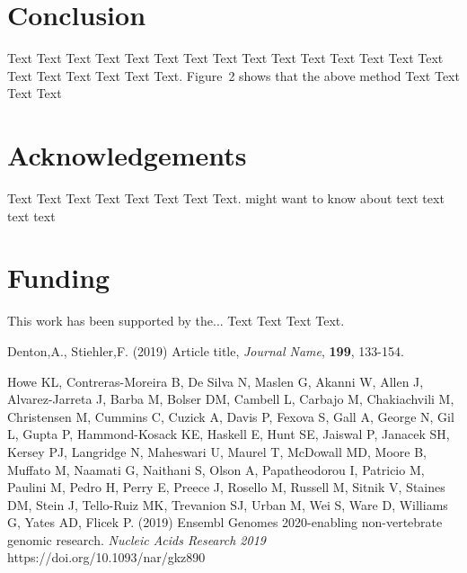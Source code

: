 \documentclass{bioinfo}
\begin{document}
%
%






\section{Conclusion}

Text Text Text Text Text Text  Text Text Text Text Text Text Text
Text Text  Text Text Text Text Text Text.
Figure~2\vphantom{\ref{fig:02}} shows that the above method  Text
Text Text Text\vspace*{-10pt}


\section*{Acknowledgements}

Text Text Text Text Text Text  Text Text.  \citealp{Boffelli03} might want to know about  text
text text text\vspace*{-12pt}

\section*{Funding}

This work has been supported by the... Text Text  Text Text.\vspace*{-12pt}

%
%
%
%
%
%
%
%
%


\begin{thebibliography}{}

Denton,A., Stiehler,F. (2019) Article title, {\it Journal Name}, {\bf 199}, 133-154.

Howe KL, Contreras-Moreira B, De Silva N, Maslen G, Akanni W, Allen J, Alvarez-Jarreta J, Barba M, Bolser DM, Cambell L, Carbajo M, Chakiachvili M, Christensen M, Cummins C, Cuzick A, Davis P, Fexova S, Gall A, George N, Gil L, Gupta P, Hammond-Kosack KE, Haskell E, Hunt SE, Jaiswal P, Janacek SH, Kersey PJ, Langridge N, Maheswari U, Maurel T, McDowall MD, Moore B, Muffato M, Naamati G, Naithani S, Olson A, Papatheodorou I, Patricio M, Paulini M, Pedro H, Perry E, Preece J, Rosello M, Russell M, Sitnik V, Staines DM, Stein J, Tello-Ruiz MK, Trevanion SJ, Urban M, Wei S, Ware D, Williams G, Yates AD, Flicek P. (2019) Ensembl Genomes 2020-enabling non-vertebrate genomic research. {\it Nucleic Acids Research 2019} https://doi.org/10.1093/nar/gkz890

\end{thebibliography}
\end{document}
